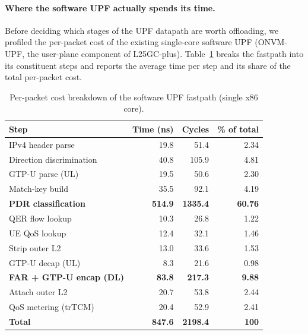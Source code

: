 \documentclass[conference]{IEEEtran}
\begin{document}
\paragraph{Where the software UPF actually spends its time.}
Before deciding which stages of the UPF datapath are worth
offloading, we profiled the per-packet cost of the existing
single-core software UPF (ONVM-UPF, the user-plane component of
L25GC-plus).  Table~\ref{tab:swupf-profile} breaks the fastpath into
its constituent steps and reports the average time per step and its
share of the total per-packet cost.

\begin{table}[!h]
  \centering
  \caption{Per-packet cost breakdown of the software UPF fastpath
           (single x86 core).}
  \label{tab:swupf-profile}
  \footnotesize
  \setlength{\tabcolsep}{4pt}
  \begin{tabular}{@{}lrrr@{}}
    \toprule
    Step                                 & Time (ns) & Cycles  & \% of total \\
    \midrule
    IPv4 header parse                    &  19.8     &   51.4  &  2.34 \\
    Direction discrimination             &  40.8     &  105.9  &  4.81 \\
    GTP-U parse (UL)                     &  19.5     &   50.6  &  2.30 \\
    Match-key build                      &  35.5     &   92.1  &  4.19 \\
    \textbf{PDR classification}          & \textbf{514.9} & \textbf{1335.4} & \textbf{60.76} \\
    QER flow lookup                      &  10.3     &   26.8  &  1.22 \\
    UE QoS lookup                        &  12.4     &   32.1  &  1.46 \\
    Strip outer L2                       &  13.0     &   33.6  &  1.53 \\
    GTP-U decap (UL)                     &   8.3     &   21.6  &  0.98 \\
    \textbf{FAR + GTP-U encap (DL)}      & \textbf{83.8}  & \textbf{217.3}  &  \textbf{9.88} \\
    Attach outer L2                      &  20.7     &   53.8  &  2.44 \\
    QoS metering (trTCM)                 &  20.4     &   52.9  &  2.41 \\
    \midrule
    \textbf{Total}                       & \textbf{847.6} & \textbf{2198.4} & \textbf{100} \\
    \bottomrule
  \end{tabular}
\end{table}
\end{document}
